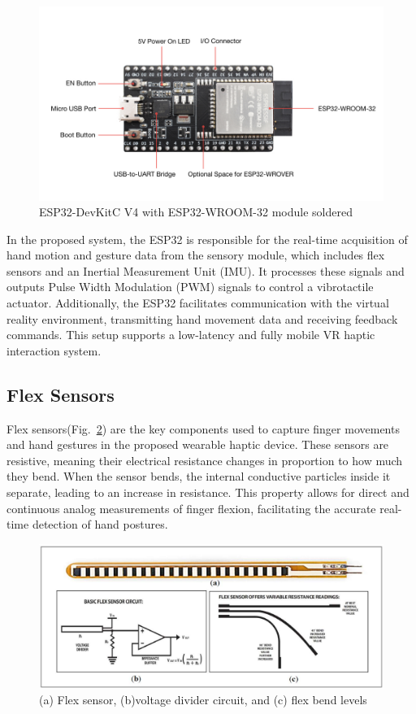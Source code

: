 \begin{figure}[H]\centering
	\includegraphics[width=1\textwidth]{Pictures/esp32.jpg}%
	\caption{ESP32-DevKitC V4 with ESP32-WROOM-32 module soldered~\cite{esp32docs}}\label{fig:esp32}%
\end{figure}

In the proposed system, the ESP32 is responsible for the real-time acquisition of hand motion and gesture data from the sensory module, which includes flex sensors and an Inertial Measurement Unit (IMU). It processes these signals and outputs Pulse Width Modulation (PWM) signals to control a vibrotactile actuator. Additionally, the ESP32 facilitates communication with the virtual reality environment, transmitting hand movement data and receiving feedback commands. This setup supports a low-latency and fully mobile VR haptic interaction system.

\newpage
\subsection{Flex Sensors}
Flex sensors(Fig.~\ref{fig:flex_sensor}) are the key components used to capture finger movements and hand gestures in the proposed wearable haptic device. These sensors are resistive, meaning their electrical resistance changes in proportion to how much they bend. When the sensor bends, the internal conductive particles inside it separate, leading to an increase in resistance. This property allows for direct and continuous analog measurements of finger flexion, facilitating the accurate real-time detection of hand postures.

\begin{figure}[H]\centering
	\includegraphics[width=1\textwidth]{Pictures/flex_sensor.png}%
	\caption{(a) Flex sensor, (b)voltage divider circuit, and (c) flex bend levels~\cite{10.3390/s18072208}}\label{fig:flex_sensor}%
\end{figure}

